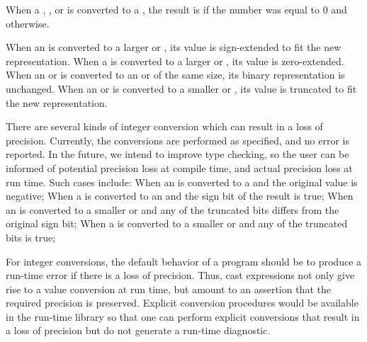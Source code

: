 When a , , or  is converted to a , the result is  if the number was equal to 0 and  otherwise.

When an  is converted to a larger  or , its value is
sign-extended to fit the new representation.
When a  is converted to a larger  or , its value
is zero-extended.
When an  or  is converted to an  or 
of the same size, its binary representation is unchanged.
When an  or  is converted to a smaller 
or , its value is truncated to fit the new representation.

\begin{future}
There are several kinds of integer conversion which can result in a loss of
precision.  Currently, the conversions are performed as specified, and no error
is reported.  In the future, we intend to improve type checking, so the user can
be informed of potential precision loss at compile time, and actual precision
loss at run time.  Such cases include:
%
When an  is converted to a  and the original value is
negative;
When a  is converted to an  and the sign bit of the result
is true;
When an  is converted to a smaller  or  and any
of the truncated bits differs from the original sign bit;
%
When a  is converted to a smaller  or  and any
of the truncated bits is true;
\end{future}

\begin{rationale}
For integer conversions, the default behavior of a program should be to produce
a run-time error if there is a loss of precision.  Thus, cast expressions not only
give rise to a value conversion at run time, but amount to an assertion
that the required precision is preserved.  Explicit conversion procedures would be
available in the run-time library so that one can perform explicit conversions
that result in a loss of precision but do not generate a run-time diagnostic.
\end{rationale}


